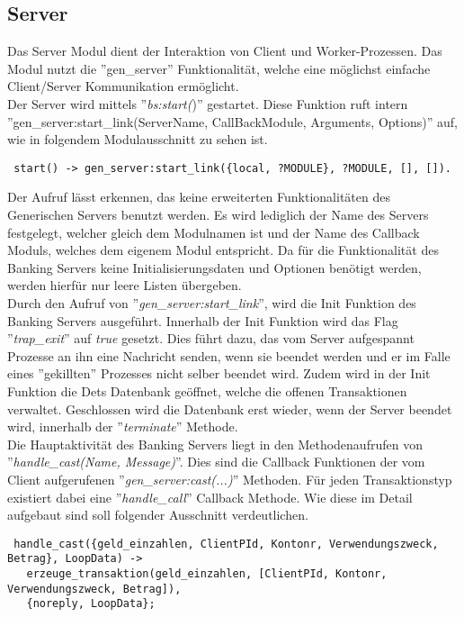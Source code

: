 \subsection{Server}
Das Server Modul dient der Interaktion von Client und Worker-Prozessen. Das Modul nutzt die ''gen\_server'' Funktionalität, welche eine möglichst einfache Client/Server Kommunikation ermöglicht.\\
Der Server wird mittels ''\textit{bs:start(})'' gestartet. Diese Funktion ruft intern ''gen\_server:start\_link(ServerName, CallBackModule, Arguments, Options)'' auf, wie in folgendem Modulausschnitt zu sehen ist.
\begin{lstlisting}
 start() -> gen_server:start_link({local, ?MODULE}, ?MODULE, [], []).
\end{lstlisting}
Der Aufruf lässt erkennen, das keine erweiterten Funktionalitäten des Generischen Servers benutzt werden. Es wird lediglich der Name des Servers festgelegt, welcher gleich dem Modulnamen ist und der Name des Callback Moduls, welches dem eigenem Modul entspricht. Da für die Funktionalität des Banking Servers keine Initialisierungsdaten und Optionen benötigt werden, werden hierfür nur leere Listen übergeben.\\
Durch den Aufruf von ''\textit{gen\_server:start\_link}'', wird die Init Funktion des Banking Servers ausgeführt.
Innerhalb der Init Funktion wird das Flag ''\textit{trap\_exit}'' auf \textit{true} gesetzt. Dies führt dazu, das vom Server aufgespannt Prozesse an ihn eine Nachricht senden, wenn sie beendet werden und er im Falle eines ''gekillten'' Prozesses nicht selber beendet wird. Zudem wird in der Init Funktion die Dets Datenbank geöffnet, welche die offenen Transaktionen verwaltet. Geschlossen wird die Datenbank erst wieder, wenn der Server beendet wird, innerhalb der ''\textit{terminate}'' Methode.\\
Die Hauptaktivität des Banking Servers liegt in den Methodenaufrufen von ''\textit{handle\_cast(Name, Message)}''. Dies sind die Callback Funktionen der vom Client aufgerufenen ''\textit{gen\_server:cast(...)}'' Methoden. Für jeden Transaktionstyp existiert dabei eine ''\textit{handle\_call}'' Callback Methode. Wie diese im Detail aufgebaut sind soll folgender Ausschnitt verdeutlichen.
\begin{lstlisting}
 handle_cast({geld_einzahlen, ClientPId, Kontonr, Verwendungszweck, Betrag}, LoopData) ->
   erzeuge_transaktion(geld_einzahlen, [ClientPId, Kontonr, Verwendungszweck, Betrag]),
   {noreply, LoopData};
\end{lstlisting}
